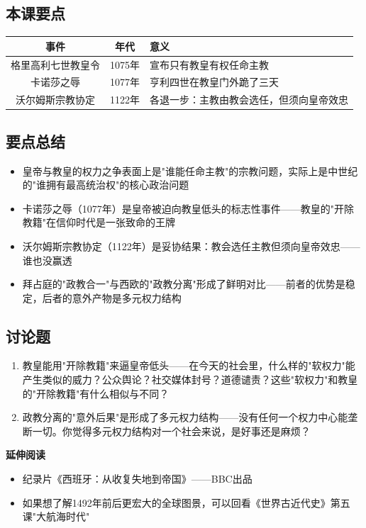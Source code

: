 \documentclass[a4paper,12pt]{ctexart}
\begin{document}
\subsection*{本课要点}

\begin{center}
\begin{tabular}{|c|c|p{7cm}|}
\hline
\textbf{事件} & \textbf{年代} & \textbf{意义} \\
\hline
格里高利七世教皇令 & 1075年 & 宣布只有教皇有权任命主教 \\
\hline
卡诺莎之辱 & 1077年 & 亨利四世在教皇门外跪了三天 \\
\hline
沃尔姆斯宗教协定 & 1122年 & 各退一步：主教由教会选任，但须向皇帝效忠 \\
\hline
\end{tabular}
\end{center}

\subsection*{要点总结}
\begin{itemize}
  \item 皇帝与教皇的权力之争表面上是"谁能任命主教"的宗教问题，实际上是中世纪的"谁拥有最高统治权"的核心政治问题
  \item 卡诺莎之辱（1077年）是皇帝被迫向教皇低头的标志性事件——教皇的"开除教籍"在信仰时代是一张致命的王牌
  \item 沃尔姆斯宗教协定（1122年）是妥协结果：教会选任主教但须向皇帝效忠——谁也没赢透
  \item 拜占庭的"政教合一"与西欧的"政教分离"形成了鲜明对比——前者的优势是稳定，后者的意外产物是多元权力结构
\end{itemize}

\subsection*{讨论题}
\begin{enumerate}
  \item 教皇能用"开除教籍"来逼皇帝低头——在今天的社会里，什么样的"软权力"能产生类似的威力？公众舆论？社交媒体封号？道德谴责？这些"软权力"和教皇的"开除教籍"有什么相似与不同？
  \item 政教分离的"意外后果"是形成了多元权力结构——没有任何一个权力中心能垄断一切。你觉得多元权力结构对一个社会来说，是好事还是麻烦？
\end{enumerate}

\vspace{0.3cm}
\textcolor{blue!70!black}{\textbf{延伸阅读}}
\begin{itemize}
  \item 纪录片《西班牙：从收复失地到帝国》——BBC出品
  \item 如果想了解1492年前后更宏大的全球图景，可以回看《世界古近代史》第五课"大航海时代"
\end{itemize}
\end{document}
